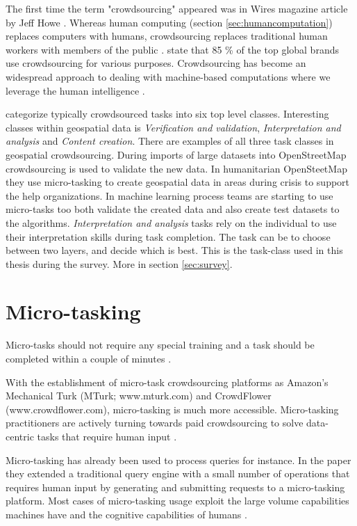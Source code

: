 The first time the term "crowdsourcing" appeared was in Wires magazine article by Jeff Howe \citep{Howe2006}. Whereas human computing (section \ref{sec:humancomputation}) replaces computers with humans, crowdsourcing replaces traditional human workers with members of the public \citep{Quinn2011}. \cite{EYeka2015} state that 85 \% of the top global brands use crowdsourcing for various purposes. Crowdsourcing has become an widespread approach to dealing with machine-based computations where we leverage the human intelligence \citep{Gadiraju2015}.

\cite{Gadiraju2015} categorize typically crowdsourced tasks into six top level classes. Interesting classes within geospatial data is \textit{Verification and validation}, \textit{Interpretation and analysis} and \textit{Content creation}. There are examples of all three task classes in geospatial crowdsourcing. During imports of large datasets into OpenStreetMap crowdsourcing is used to validate the new data. In humanitarian OpenSteetMap they use micro-tasking to create geospatial data in areas during crisis to support the help organizations. In machine learning process teams are starting to use micro-tasks too both validate the created data and also create test datasets to the algorithms.\textit{ Interpretation and analysis} tasks rely on the individual to use their interpretation skills during task completion. The task can be to choose between two layers, and decide which is best. This is the task-class used in this thesis during the survey. More in section \ref{sec:survey}.

\section{Micro-tasking}

Micro-tasks should not require any special training and a task should be completed within a couple of minutes \citep{Ipeirotis2010}.  

With the establishment of micro-task crowdsourcing platforms as Amazon's Mechanical Turk (MTurk; www.mturk.com) and CrowdFlower (www.crowdflower.com), micro-tasking is much more accessible. Micro-tasking practitioners are actively turning towards paid crowdsourcing to solve data-centric tasks that require human input \citep{Gadiraju2015}. 

Micro-tasking has already been used to process queries for instance. In the \cite{Franklin2011} paper they extended a traditional query engine with a small number of operations that requires human input by generating and submitting requests to a micro-tasking platform. Most cases of micro-tasking usage exploit the large volume capabilities machines have and the cognitive capabilities of humans \citep{Difallah2016}.  

